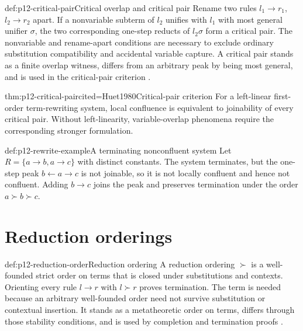 \begin{hbdefinition}{def:p12-critical-pair}{Critical overlap and critical pair}
Rename two rules \(l_1\to r_1\), \(l_2\to r_2\) apart. If a nonvariable
subterm of \(l_2\) unifies with \(l_1\) with most general unifier \(\sigma\),
the two corresponding one-step reducts of \(l_2\sigma\) form a critical pair.
The nonvariable and rename-apart conditions are necessary to exclude ordinary
substitution compatibility and accidental variable capture. A critical pair
stands as a finite overlap witness, differs from an arbitrary peak by being
most general, and is used in the critical-pair criterion
\cite{Huet1973,Huet1980}.
\end{hbdefinition}

\begin{hbtheorem}{thm:p12-critical-pair}{cited=Huet1980}{Critical-pair criterion}
For a left-linear first-order term-rewriting system, local confluence is
equivalent to joinability of every critical pair. Without left-linearity,
variable-overlap phenomena require the corresponding stronger formulation.
\end{hbtheorem}

\begin{hbexample}{def:p12-rewrite-example}{A terminating nonconfluent system}
Let \(R=\{a\to b,a\to c\}\) with distinct constants. The system terminates,
but the one-step peak \(b\leftarrow a\to c\) is not joinable, so it is not
locally confluent and hence not confluent. Adding \(b\to c\) joins the peak
and preserves termination under the order \(a\succ b\succ c\).
\end{hbexample}

\section{Reduction orderings}

\begin{hbdefinition}{def:p12-reduction-order}{Reduction ordering}
A reduction ordering \(\succ\) is a well-founded strict order on terms that is
closed under substitutions and contexts. Orienting every rule \(l\to r\) with
\(l\succ r\) proves termination. The term is needed because an arbitrary
well-founded order need not survive substitution or contextual insertion. It
stands as a metatheoretic order on terms, differs through those stability
conditions, and is used by completion and termination proofs
\cite{Dershowitz1982,BaaderNipkow1998}.
\end{hbdefinition}

